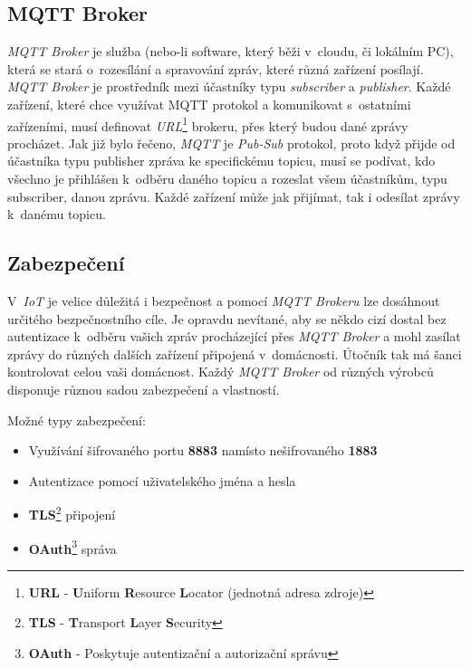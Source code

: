 \subsection*{MQTT Broker}
\emph{MQTT Broker} je služba (nebo-li software, který běži v~cloudu, či lokálním PC), která se stará o~rozesílání a spravování zpráv, které různá zařízení posílají.
\emph{MQTT Broker} je prostředník mezi účastníky typu \emph{subscriber} a \emph{publisher}.
Každé zařízení, které chce využívat MQTT protokol a komunikovat s~ostatními zařízeními, musí definovat \emph{URL}\footnote{\textbf{URL} - \textbf{U}niform \textbf{R}esource \textbf{L}ocator (jednotná adresa zdroje)} brokeru, přes který budou dané zprávy procházet.
Jak již bylo řečeno, \emph{MQTT} je \emph{Pub-Sub} protokol, proto když přijde od účastníka typu publisher zpráva ke specifickému topicu, musí se podívat, kdo všechno je přihlášen k~odběru daného topicu a rozeslat všem účastníkům, typu subscriber, danou zprávu.
Každé zařízení může jak přijímat, tak i odesílat zprávy k~danému topicu.~\cite{wiki:mqtt}

\subsection*{Zabezpečení}
V~\emph{IoT} je velice důležitá i bezpečnost a pomocí \emph{MQTT Brokeru} lze dosáhnout určitého bezpečnostního cíle. Je opravdu nevítané, aby se někdo cizí dostal bez autentizace k~odběru vašich
zpráv procházející přes \emph{MQTT Broker} a mohl zasílat zprávy do různých dalších zařízení připojená v~domácnosti.
Útočník tak má šanci kontrolovat celou vaši domácnost. Každý \emph{MQTT Broker} od různých výrobců disponuje různou sadou zabezpečení a vlastností.~\cite{wiki:mqtt}
\newline

Možné typy zabezpečení:
\begin{itemize}
  \item Využívání šifrovaného portu \textbf{8883} namísto nešifrovaného \textbf{1883}
  \item Autentizace pomocí uživatelského jména a hesla
  \item \textbf{TLS}\footnote{\textbf{TLS} - \textbf{T}ransport \textbf{L}ayer \textbf{S}ecurity} připojení
  \item \textbf{OAuth}\footnote{\textbf{OAuth} - Poskytuje autentizační a autorizační správu} správa
\end{itemize}

\newpage
